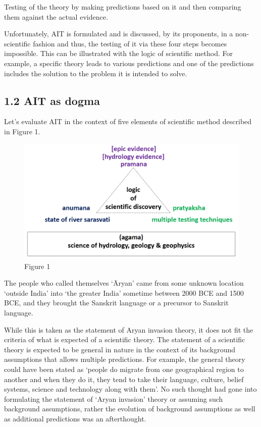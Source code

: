  \item Testing of the theory by making predictions based on it and then comparing them against the actual evidence.

Unfortunately, AIT is formulated and is discussed, by its proponents, in a non-scientific fashion and thus, the testing of it via these four steps becomes impossible. This can be illustrated with the logic of scientific method. For example, a specific theory leads to various predictions and one of the predictions includes the solution to the problem it is intended to solve.


\subsection{1.2 AIT as dogma}

Let’s evaluate AIT in the context of five elements of scientific method described in Figure 1.

\begin{figure}
\includegraphics{"images/8-01.jpg"}
\caption{Figure 1}
\end{figure}

\item The people who called themselves ‘Āryan’ came from some unknown location ‘outside India’ into ‘the greater India’ sometime between 2000 BCE and 1500 BCE, and they brought the Sanskrit language or a precursor to Sanskrit language.

 While this is taken as the statement of Aryan invasion theory, it does not fit the criteria of what is expected of a scientific theory. The statement of a scientific theory is expected to be general in nature in the context of its background assumptions that allows multiple predictions. For example, the general theory could have been stated as ‘people do migrate from one geographical region to another and when they do it, they tend to take their language, culture, belief systems, science and technology along with them’. No such thought had gone into formulating the statement of ‘Aryan invasion’ theory or assuming such background assumptions, rather the evolution of background assumptions as well as additional predictions was an afterthought.

